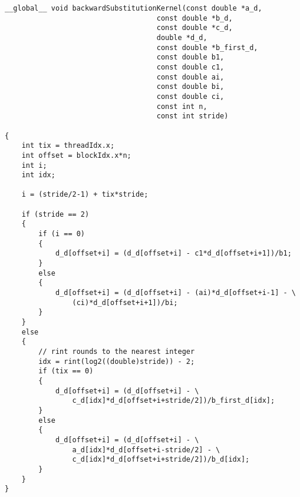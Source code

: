 \begin{verbatim}
__global__ void backwardSubstitutionKernel(const double *a_d,
                                    const double *b_d,
                                    const double *c_d,
                                    double *d_d,
                                    const double *b_first_d,
                                    const double b1,
                                    const double c1,
                                    const double ai,
                                    const double bi,
                                    const double ci,
                                    const int n,
                                    const int stride)

{
    int tix = threadIdx.x;
    int offset = blockIdx.x*n;
    int i;
    int idx;

    i = (stride/2-1) + tix*stride;

    if (stride == 2)
    {
        if (i == 0)
        {
            d_d[offset+i] = (d_d[offset+i] - c1*d_d[offset+i+1])/b1;
        }
        else
        {
            d_d[offset+i] = (d_d[offset+i] - (ai)*d_d[offset+i-1] - \
                (ci)*d_d[offset+i+1])/bi;
        }
    }
    else
    {
        // rint rounds to the nearest integer
        idx = rint(log2((double)stride)) - 2;
        if (tix == 0) 
        {   
            d_d[offset+i] = (d_d[offset+i] - \
                c_d[idx]*d_d[offset+i+stride/2])/b_first_d[idx];
        }
        else
        {
            d_d[offset+i] = (d_d[offset+i] - \
                a_d[idx]*d_d[offset+i-stride/2] - \
                c_d[idx]*d_d[offset+i+stride/2])/b_d[idx];
        }
    }
}
\end{verbatim}

